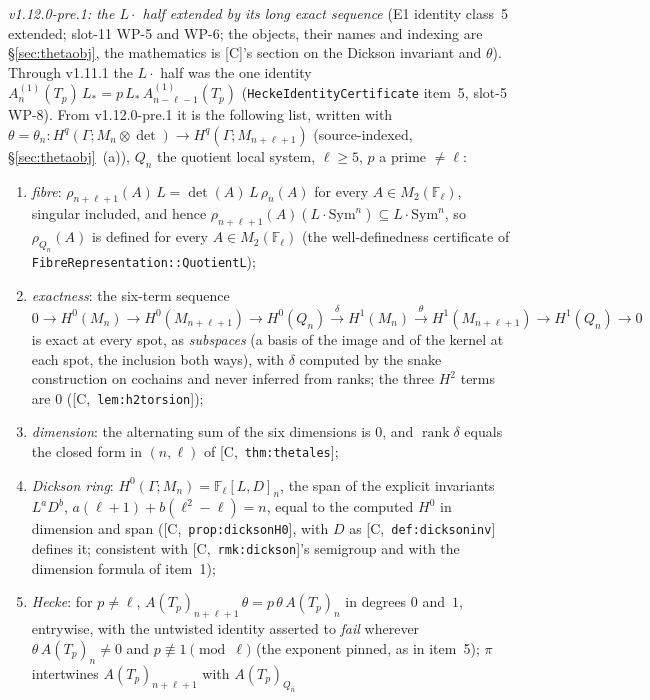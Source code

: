 \documentclass[11pt]{article}
\theoremstyle{remark}
\newcommand{\F}{\mathbb{F}}
\newcommand{\Sym}{\mathrm{Sym}}
\newcommand{\Ga}{\Gamma}
\newcommand{\Fl}{\F_\ell}
\DeclareMathOperator{\rank}{rank}
\newcommand{\Mn}{M_n}
\newcommand{\HA}[1]{[C,~\texttt{#1}]}      %
\begin{document}
\begin{enumerate}
  \emph{v1.12.0-pre.1: the $L\cdot$ half extended by its long exact sequence} (E1 identity
  class~5 extended; slot-11 WP-5 and WP-6; the objects, their names and indexing are
  \S\ref{sec:thetaobj}, the mathematics is [C]'s section on the Dickson invariant and $\theta$).
  Through v1.11.1 the $L\cdot$ half was the one identity
  $A^{(1)}_n(T_p)\,L_\ast=p\,L_\ast\,A^{(1)}_{n-\ell-1}(T_p)$ (\texttt{HeckeIdentityCertificate}
  item~5, slot-5 WP-8). From v1.12.0-pre.1 it is the following list, written with
  $\theta=\theta_n:H^q(\Ga;\Mn\otimes\det)\to H^q(\Ga;M_{n+\ell+1})$ (source-indexed,
  \S\ref{sec:thetaobj}~(a)), $Q_n$ the quotient local system, $\ell\ge5$, $p$ a prime $\ne\ell$:
  \begin{enumerate}[label=(6\alph*)]
  \item \emph{fibre}: $\rho_{n+\ell+1}(A)\,L=\det(A)\,L\,\rho_n(A)$ for every $A\in M_2(\Fl)$,
    singular included, and hence $\rho_{n+\ell+1}(A)(L\cdot\Sym^n)\subseteq L\cdot\Sym^n$, so
    $\rho_{Q_n}(A)$ is defined for every $A\in M_2(\Fl)$ (the well-definedness certificate of
    \texttt{FibreRepresentation::QuotientL});
  \item \emph{exactness}: the six-term sequence
    $0\to H^0(\Mn)\to H^0(M_{n+\ell+1})\to H^0(Q_n)\xrightarrow{\delta}H^1(\Mn)\xrightarrow{\theta}
    H^1(M_{n+\ell+1})\to H^1(Q_n)\to0$ is exact at every spot, as \emph{subspaces} (a basis of the
    image and of the kernel at each spot, the inclusion both ways), with $\delta$ computed by the
    snake construction on cochains and never inferred from ranks; the three $H^2$ terms are $0$
    (\HA{lem:h2torsion});
  \item \emph{dimension}: the alternating sum of the six dimensions is $0$, and $\rank\delta$
    equals the closed form in $(n,\ell)$ of \HA{thm:thetales};
  \item \emph{Dickson ring}: $H^0(\Ga;\Mn)=\Fl[L,D]_n$, the span of the explicit invariants
    $L^aD^b$, $a(\ell+1)+b(\ell^2-\ell)=n$, equal to the computed $H^0$ in dimension and span
    (\HA{prop:dicksonH0}, with $D$ as \HA{def:dicksoninv} defines it; consistent with
    \HA{rmk:dickson}'s semigroup and with the dimension formula of item~1);
  \item \emph{Hecke}: for $p\ne\ell$, $A(T_p)_{n+\ell+1}\,\theta=p\,\theta\,A(T_p)_n$ in degrees
    $0$ and~$1$, entrywise, with the untwisted identity asserted to \emph{fail} wherever
    $\theta\,A(T_p)_n\ne0$ and $p\not\equiv1\pmod\ell$ (the exponent pinned, as in item~5); $\pi$ intertwines $A(T_p)_{n+\ell+1}$ with $A(T_p)_{Q_n}$

\end{enumerate}
\end{enumerate}
\end{document}
